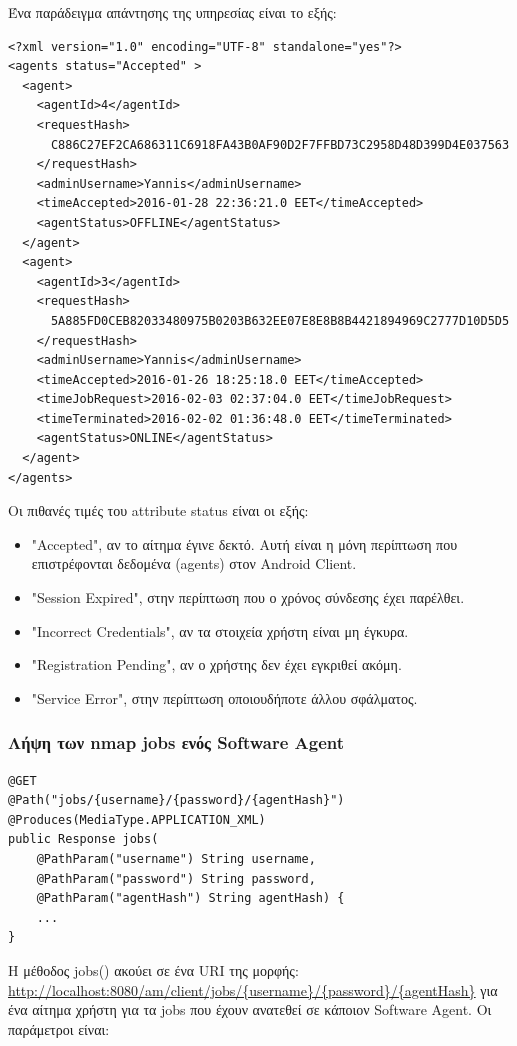 \documentclass[a4paper,11pt]{article}
\begin{document}
\begin{sloppypar}
\begin{itemize}
\end{itemize}
Ένα παράδειγμα απάντησης της υπηρεσίας είναι το εξής:
\newpage


\begin{lstlisting}
<?xml version="1.0" encoding="UTF-8" standalone="yes"?>
<agents status="Accepted" >
  <agent>
    <agentId>4</agentId>
    <requestHash>
      C886C27EF2CA686311C6918FA43B0AF90D2F7FFBD73C2958D48D399D4E037563
    </requestHash>
    <adminUsername>Yannis</adminUsername>
    <timeAccepted>2016-01-28 22:36:21.0 EET</timeAccepted>
    <agentStatus>OFFLINE</agentStatus>
  </agent>
  <agent>
    <agentId>3</agentId>
    <requestHash>
      5A885FD0CEB82033480975B0203B632EE07E8E8B8B4421894969C2777D10D5D5
    </requestHash>
    <adminUsername>Yannis</adminUsername>
    <timeAccepted>2016-01-26 18:25:18.0 EET</timeAccepted>
    <timeJobRequest>2016-02-03 02:37:04.0 EET</timeJobRequest>
    <timeTerminated>2016-02-02 01:36:48.0 EET</timeTerminated>
    <agentStatus>ONLINE</agentStatus>
  </agent>
</agents>
\end{lstlisting}
Οι πιθανές τιμές του attribute status είναι οι εξής:
\begin{itemize}
\item "Accepted", αν το αίτημα έγινε δεκτό. Αυτή είναι η μόνη περίπτωση που επιστρέφονται δεδομένα (agents) στον Android Client.
\item "Session Expired", στην περίπτωση που ο χρόνος σύνδεσης έχει παρέλθει.
\item "Incorrect Credentials", αν τα στοιχεία χρήστη είναι μη έγκυρα.
\item "Registration Pending", αν ο χρήστης δεν έχει εγκριθεί ακόμη.
\item "Service Error", στην περίπτωση οποιουδήποτε άλλου σφάλματος.
\end{itemize}

\subsubsection{Λήψη των nmap jobs ενός Software Agent}
\begin{lstlisting}
@GET
@Path("jobs/{username}/{password}/{agentHash}")
@Produces(MediaType.APPLICATION_XML)
public Response jobs(
    @PathParam("username") String username,
    @PathParam("password") String password,
    @PathParam("agentHash") String agentHash) {
    ...
}
\end{lstlisting}
Η μέθοδος jobs() ακούει σε ένα URI της μορφής: \url{http://localhost:8080/am/client/jobs/{username}/{password}/{agentHash}} για ένα αίτημα χρήστη για τα jobs που έχουν ανατεθεί σε κάποιον Software Agent. Οι παράμετροι είναι:
\begin{itemize}


\end{itemize}
\end{sloppypar}
\end{document}
